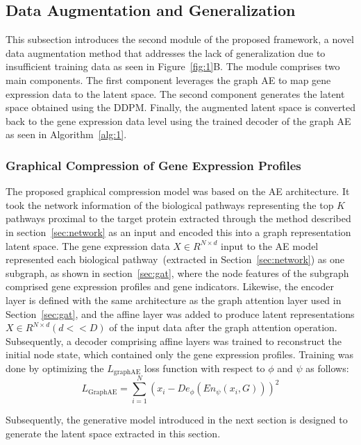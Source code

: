 \documentclass[runningheads]{llncs}
\begin{document}
\subsection{Data Augmentation and Generalization}\label{sec:augment}

This subsection introduces the second module of the proposed framework, a novel data augmentation method that addresses the lack of generalization due to insufficient training data as seen in Figure~\ref{fig:1}B. The module comprises two main components. The first component leverages the graph AE to map gene expression data to the latent space. The second component generates the latent space obtained using the DDPM. Finally, the augmented latent space is converted back to the gene expression data level using the trained decoder of the graph AE as seen in Algorithm~\ref{alg:1}.

\subsubsection{Graphical Compression of Gene Expression Profiles}\label{sec:compress}

The proposed graphical compression model was based on the AE architecture. It took the network information of the biological pathways representing the top $K$ pathways proximal to the target protein extracted through the method described in section~\ref{sec:network} as an input and encoded this into a graph representation latent space. The gene expression data $X \in R^{N \times d}$ input to the AE model represented each biological pathway~(extracted in Section~\ref{sec:network}) as one subgraph, as shown in section~\ref{sec:gat}, where the node features of the subgraph comprised gene expression profiles and gene indicators. Likewise, the encoder layer is defined with the same architecture as the graph attention layer used in Section~\ref{sec:gat}, and the affine layer was added to produce latent representations $X \in R^{N \times d} (d << D)$ of the input data after the graph attention operation. Subsequently, a decoder comprising affine layers was trained to reconstruct the initial node state, which contained only the gene expression profiles. Training was
done by optimizing the $L_{\text{graphAE}}$ loss function with respect to $\phi$ and $\psi$ as follows:
%
\begin{equation}
L_{\text{GraphAE}} = \sum_{i=1}^{N} (x_i - De_{\phi}(En_{\psi}(x_i, G)))^2
\end{equation}

Subsequently, the generative model introduced in the next section is designed to generate the latent space extracted in this section.
\end{document}

